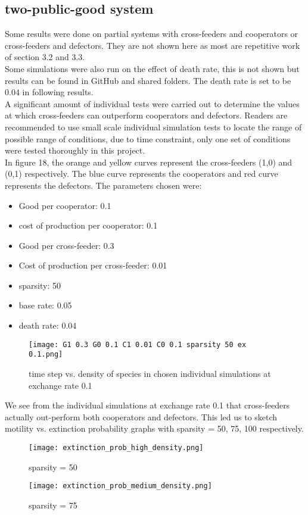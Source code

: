 \documentclass[11pt]{article}
\begin{document}
\subsection{two-public-good system}
Some results were done on partial systems with cross-feeders and cooperators or cross-feeders and defectors. They are not shown here as most are repetitive work of section 3.2 and 3.3.\\
Some simulations were also run on the effect of death rate, this is not shown but results can be found in GitHub and shared folders. The death rate is set to be 0.04 in following results.\\
A significant amount of individual tests were carried out to determine the values at which cross-feeders can outperform cooperators and defectors. Readers are recommended to use small scale individual simulation tests to locate the range of possible range of conditions, due to time constraint, only one set of conditions were tested thoroughly in this project.\\
In figure 18, the orange and yellow curves represent the cross-feeders (1,0) and (0,1) respectively. The blue curve represents the cooperators and red curve represents the defectors. The parameters chosen were:
\begin{itemize}
    \item Good per cooperator: 0.1
    \item cost of production per cooperator: 0.1
    \item Good per cross-feeder: 0.3
    \item Cost of production per cross-feeder: 0.01
    \item sparsity: 50
    \item base rate: 0.05
    \item death rate: 0.04
\end{itemize}
\begin{figure}[H]
    \centering
    \texttt{[image: G1 0.3 G0 0.1 C1 0.01 C0 0.1 sparsity 50 ex 0.1.png]}
    \caption{time step vs. density of species in chosen individual simulations at exchange rate 0.1}
\end{figure}
\noindent We see from the individual simulations at exchange rate 0.1 that cross-feeders actually out-perform both cooperators and defectors. This led us to sketch motility vs. extinction probability graphs with sparsity = 50, 75, 100 respectively.
\begin{figure}[H]
    \begin{minipage}[b]{0.5\linewidth}
      \centering
    \texttt{[image: extinction\_prob\_high\_density.png]}
    \caption{sparsity = 50}
        \end{minipage}
        \hfill
    \begin{minipage}[b]{0.5\linewidth}
    \centering
    \texttt{[image: extinction\_prob\_medium\_density.png]}
    \caption{sparsity = 75}
        \end{minipage}
\end{figure}
\end{document}
